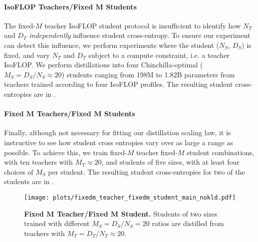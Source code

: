 \paragraph{IsoFLOP Teachers/Fixed $\bm M$ Students}
The fixed-$M$ teacher IsoFLOP student protocol is insufficient to identify how $N_T$ and $D_T$ \emph{independently} influence student cross-entropy.
To ensure our experiment can detect this influence,
we perform experiments where the student ($N_S$, $D_S$) is fixed, and vary $N_T$ and $D_T$ subject to a compute constraint, i.e. a teacher IsoFLOP.
We perform distillations into four Chinchilla-optimal ($M_S=D_S/N_S\approx 20$) students  ranging from 198M to 1.82B parameters
from teachers trained according to four IsoFLOP profiles.
The resulting student cross-entropies are in .

\paragraph{Fixed $\bm M$ Teachers/Fixed $\bm M$ Students}
Finally, although not necessary for fitting our distillation scaling law, it is instructive to see how student cross entropies vary over as large a range as possible.
To achieve this, we train fixed-$M$ teacher fixed-$M$ student combinations,
with ten teachers with $M_T\approx 20$,
and students of five sizes, with at least four choices of $M_S$ per student.
The resulting student cross-entropies for two of the students are in .
\begin{figure}[h]
	\centering
	\texttt{[image: plots/fixedm\_teacher\_fixedm\_student\_main\_nokld.pdf]}
    \vspace{-0.2cm}
	\caption{\textbf{Fixed $\bm M$ Teacher/Fixed $\bm M$ Student.} Students of two sizes trained with different $M_S=D_S/N_S=20$ ratios are distilled from teachers with $M_T=D_T/N_T\approx 20$.
	}
    \vspace{-0.15cm}
	\label{fig:fixedm-teacher-fixedm-students}
\end{figure}
